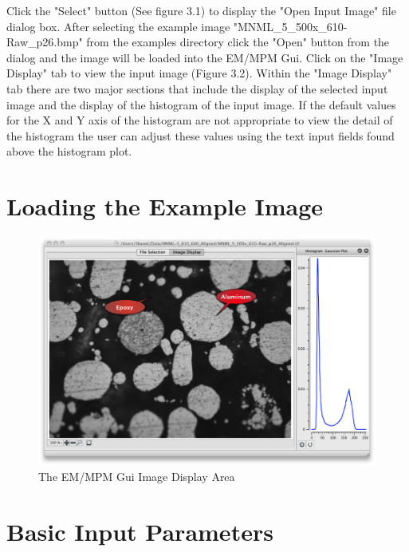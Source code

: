 \documentclass[12pt,oneside]{book}
\begin{document}
Click the "Select" button (See figure 3.1) to display the "Open Input Image" file dialog box. After selecting the example image "MNML\_5\_500x\_610-Raw\_p26.bmp" from the examples directory click the "Open" button from the dialog and the image will be loaded into the EM/MPM Gui. Click on the "Image Display" tab to view the input image (Figure 3.2). Within the "Image Display" tab there are two major sections that include the display of the selected input image and the display of the histogram of the input image. If the default values for the X and Y axis of the histogram are not appropriate to view the detail of the histogram the user can adjust these values using the text input fields found above the histogram plot. 
 

\section{Loading the Example Image}
\begin{figure}[htbp]
\begin{center}
\includegraphics[width=6.0in]{images/Untitled2.png}
\caption{The EM/MPM Gui Image Display Area}
\label{image2}
\end{center}
\end{figure}

\section{Basic Input Parameters}
\end{document}
